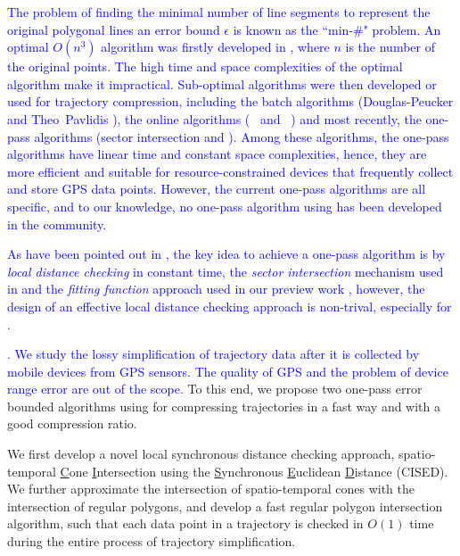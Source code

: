 \textcolor{blue}{The problem of finding the minimal number of line segments to represent the original polygonal lines \wrt an error bound $\epsilon$ is known as the ``min-\#" problem\cite{Imai:Optimal,Chan:Optimal}.}
%
\textcolor{blue}{An optimal $O(n^3)$  \lsa algorithm was firstly developed in \cite{Imai:Optimal}, where $n$ is the number of the original points. The high time and space complexities of the optimal \lsa algorithm make it impractical.}
%
\textcolor{blue}{Sub-optimal \lsa algorithms were then developed or used for trajectory compression, including the batch algorithms (\eg Douglas-Peucker \cite{Douglas:Peucker, Meratnia:Spatiotemporal, Cao:Spatio} and Theo~Pavlidis \cite{Pavlidis:Segment}), the online algorithms (\eg \bqsa~\cite{Liu:BQS} and \ \squishe \cite{Muckell:Compression}) and most recently, the one-pass algorithms (\eg sector intersection \cite{Williams:Longest, Sklansky:Cone, Dunham:Cone, Zhao:Sleeve} and \operb \cite {Lin:Operb}). }
%
\textcolor{blue}{Among these algorithms, the one-pass algorithms have linear time and constant space complexities, hence, they are more efficient and suitable for resource-constrained devices that frequently collect and store GPS data points. 
However, the current one-pass algorithms are all \ped specific, and to our knowledge, no one-pass \lsa algorithm using \sed has been developed in the community.}


\textcolor{blue}{As have been pointed out in \cite {Lin:Operb}, the key idea to achieve a one-pass algorithm is by \emph{local distance checking} in constant time, \eg the \textit{sector intersection} mechanism used in \cite{Williams:Longest, Sklansky:Cone, Dunham:Cone, Zhao:Sleeve} and the \textit{fitting function} approach used in our preview work \cite {Lin:Operb}, however, the design of an effective local distance checking approach is non-trival, especially for \sed.}



.
\textcolor{blue}{We study the lossy simplification of trajectory data after it is collected by mobile devices from GPS sensors. The quality of GPS and the problem of device range error are out of the scope. }
To this end, we propose two one-pass error bounded \lsa algorithms using \sed for compressing trajectories in a fast way and with a good compression ratio. %

 We first develop a novel local synchronous distance checking approach, \ie spatio-temporal \underline{C}one \underline{I}ntersection using the \underline{S}ynchronous \underline{E}uclidean \underline{D}istance (CISED).
We further approximate the intersection of spatio-temporal cones with the intersection of regular polygons, and develop a fast regular polygon intersection algorithm, such that each data point in a trajectory is checked in $O(1)$ time during the entire process of trajectory simplification.

